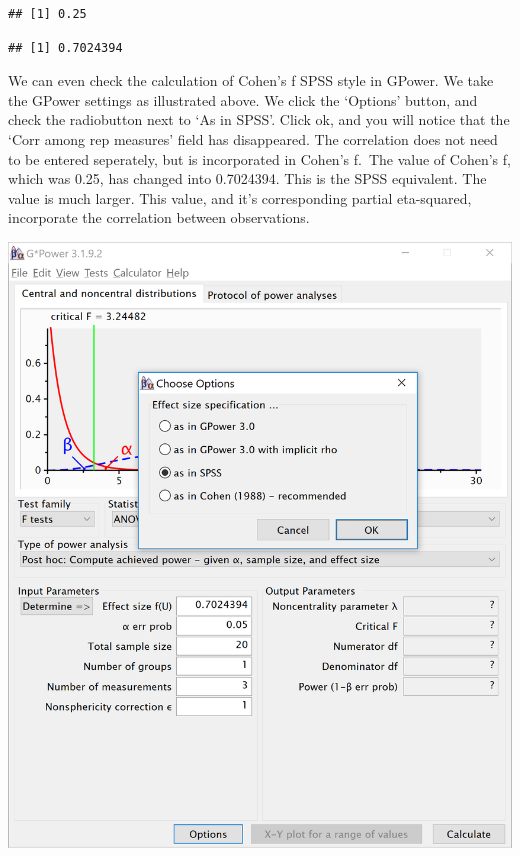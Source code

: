 \documentclass[]{book}
\newenvironment{Shaded}{\begin{snugshade}}{\end{snugshade}}
\newcommand{\KeywordTok}[1]{\textcolor[rgb]{0.13,0.29,0.53}{\textbf{#1}}}
\newcommand{\NormalTok}[1]{#1}
\newcommand{\OperatorTok}[1]{\textcolor[rgb]{0.81,0.36,0.00}{\textbf{#1}}}
\begin{document}
\begin{verbatim}
## [1] 0.25
\end{verbatim}

\begin{Shaded}
\end{Shaded}

\begin{verbatim}
## [1] 0.7024394
\end{verbatim}

We can even check the calculation of Cohen's f SPSS style in GPower. We take the GPower settings as illustrated above. We click the `Options' button, and check the radiobutton next to `As in SPSS'. Click ok, and you will notice that the `Corr among rep measures' field has disappeared. The correlation does not need to be entered seperately, but is incorporated in Cohen's f.~The value of Cohen's f, which was 0.25, has changed into 0.7024394. This is the SPSS equivalent. The value is much larger. This value, and it's corresponding partial eta-squared, incorporate the correlation between observations.

\includegraphics{screenshots/gpower_14.png}
\end{document}
